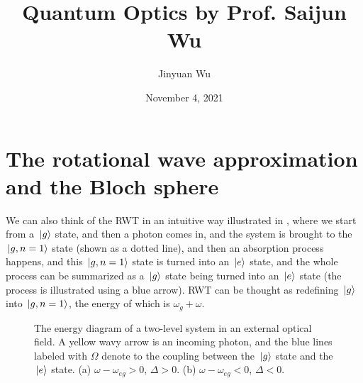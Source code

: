 \documentclass[hyperref, a4paper]{article}
\title{Quantum Optics by Prof. Saijun Wu}
\author{Jinyuan Wu}
\date{November 4, 2021}
\begin{document}
\maketitle

\section{The rotational wave approximation and the Bloch sphere}

We can also think of the RWT in an intuitive way illustrated in ,
where we start from a $\ket*{g}$ state, and then a photon comes in, and the system is brought to the $\ket*{g, n=1}$
state (shown as a dotted line), and then an absorption process happens, and this $\ket*{g, n=1}$ state 
is turned into an $\ket*{e}$ state, and the whole process can be summarized as a $\ket*{g}$ state being 
turned into an $\ket*{e}$ state (the process is illustrated using a blue arrow). RWT can be thought as 
redefining $\ket*{g}$ into $\ket*{g, n=1}$, the energy of which is $\omega_g + \omega$.

\begin{figure}
    \centering
    
    \caption{The energy diagram of a two-level system in an external optical field. A yellow wavy arrow 
    is an incoming photon, and the blue lines labeled with $\Omega$ denote to the coupling between 
    the $\ket*{g}$ state and the $\ket*{e}$ state.
    (a) $\omega - \omega_{eg} > 0$, $\Delta > 0$. (b) $\omega - \omega_{eg} < 0$, $\Delta < 0$.}
    \label{fig:energy-diagram}
\end{figure}
\end{document}
